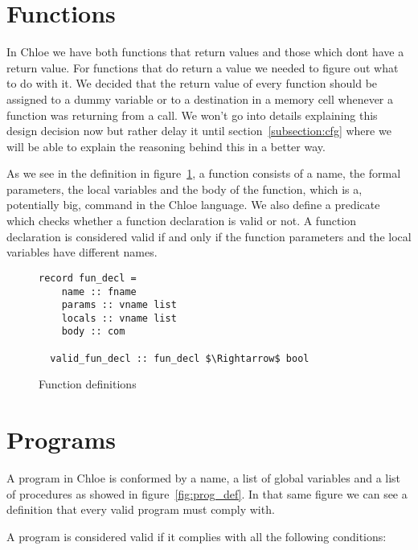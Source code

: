 \section{Functions}\label{section:functions_commands}

In Chloe we have both functions that return values and those which dont have a return value.
For functions that do return a value we needed to figure out what to do with it.
We decided that the return value of every function should be assigned to a dummy variable or to a destination in a memory cell whenever a function was returning from a call.
We won't go into details explaining this design decision now but rather delay it until section~\ref{subsection:cfg} where we will be able to explain the reasoning behind this in a better way.

As we see in the definition in figure~\ref{fig:fun_def}, a function consists of a name, the formal parameters, the local variables and the body of the function, which is a, potentially big, command in the Chloe language.
We also define a predicate which checks whether a function declaration is valid or not.
A function declaration is considered valid if and only if the function parameters and the local variables have different names.

\begin{figure}
  \begin{lstlisting}[frame=single, mathescape=true]
  record fun_decl =
    name :: fname
    params :: vname list
    locals :: vname list
    body :: com

  valid_fun_decl :: fun_decl $\Rightarrow$ bool
  \end{lstlisting}

  \caption{Function definitions}
  \label{fig:fun_def}
\end{figure}

\section{Programs}\label{section:programs_commands}

A program in Chloe is conformed by a name, a list of global variables and a list of procedures as showed in figure~\ref{fig:prog_def}.
In that same figure we can see a definition that every valid program must comply with.

A program is considered valid if it complies with all the following conditions:

